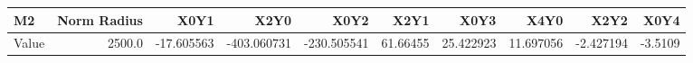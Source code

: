 \documentclass[convert={convertexe={magick.exe}, density={300}}]{standalone}
\begin{document}
\begin{tabular}{lrrrrrrrrr}
\toprule
\bf{M2} &  Norm Radius &       X0Y1 &        X2Y0 &        X0Y2 &      X2Y1 &       X0Y3 &       X4Y0 &      X2Y2 &    X0Y4 \\
\midrule
Value &       2500.0 & -17.605563 & -403.060731 & -230.505541 &  61.66455 &  25.422923 &  11.697056 & -2.427194 & -3.5109 \\
\bottomrule
\end{tabular}
\end{document}
